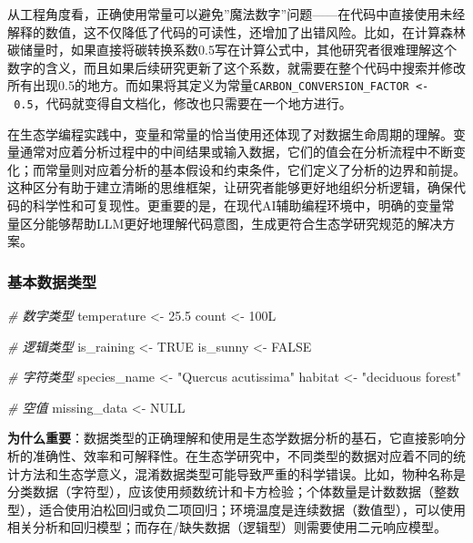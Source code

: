 \documentclass[
]{book}
\newenvironment{Shaded}{\begin{snugshade}}{\end{snugshade}}
\newcommand{\CommentTok}[1]{\textcolor[rgb]{0.56,0.35,0.01}{\textit{#1}}}
\newcommand{\ConstantTok}[1]{\textcolor[rgb]{0.56,0.35,0.01}{#1}}
\newcommand{\DataTypeTok}[1]{\textcolor[rgb]{0.13,0.29,0.53}{#1}}
\newcommand{\DecValTok}[1]{\textcolor[rgb]{0.00,0.00,0.81}{#1}}
\newcommand{\FloatTok}[1]{\textcolor[rgb]{0.00,0.00,0.81}{#1}}
\newcommand{\NormalTok}[1]{#1}
\newcommand{\OtherTok}[1]{\textcolor[rgb]{0.56,0.35,0.01}{#1}}
\newcommand{\StringTok}[1]{\textcolor[rgb]{0.31,0.60,0.02}{#1}}
\begin{document}
从工程角度看，正确使用常量可以避免''魔法数字''问题------在代码中直接使用未经解释的数值，这不仅降低了代码的可读性，还增加了出错风险。比如，在计算森林碳储量时，如果直接将碳转换系数0.5写在计算公式中，其他研究者很难理解这个数字的含义，而且如果后续研究更新了这个系数，就需要在整个代码中搜索并修改所有出现0.5的地方。而如果将其定义为常量\texttt{CARBON\_CONVERSION\_FACTOR\ \textless{}-\ 0.5}，代码就变得自文档化，修改也只需要在一个地方进行。

在生态学编程实践中，变量和常量的恰当使用还体现了对数据生命周期的理解。变量通常对应着分析过程中的中间结果或输入数据，它们的值会在分析流程中不断变化；而常量则对应着分析的基本假设和约束条件，它们定义了分析的边界和前提。这种区分有助于建立清晰的思维框架，让研究者能够更好地组织分析逻辑，确保代码的科学性和可复现性。更重要的是，在现代AI辅助编程环境中，明确的变量常量区分能够帮助LLM更好地理解代码意图，生成更符合生态学研究规范的解决方案。

\hypertarget{ux57faux672cux6570ux636eux7c7bux578b}{%
\subsubsection{基本数据类型}\label{ux57faux672cux6570ux636eux7c7bux578b}}

\begin{Shaded}
\begin{Highlighting}[]
\CommentTok{\# 数字类型}
\NormalTok{temperature }\OtherTok{\textless{}{-}} \FloatTok{25.5}
\NormalTok{count }\OtherTok{\textless{}{-}} \DecValTok{100}\DataTypeTok{L}

\CommentTok{\# 逻辑类型}
\NormalTok{is\_raining }\OtherTok{\textless{}{-}} \ConstantTok{TRUE}
\NormalTok{is\_sunny }\OtherTok{\textless{}{-}} \ConstantTok{FALSE}

\CommentTok{\# 字符类型}
\NormalTok{species\_name }\OtherTok{\textless{}{-}} \StringTok{"Quercus acutissima"}
\NormalTok{habitat }\OtherTok{\textless{}{-}} \StringTok{"deciduous forest"}

\CommentTok{\# 空值}
\NormalTok{missing\_data }\OtherTok{\textless{}{-}} \ConstantTok{NULL}
\end{Highlighting}
\end{Shaded}

\textbf{为什么重要}：数据类型的正确理解和使用是生态学数据分析的基石，它直接影响分析的准确性、效率和可解释性。在生态学研究中，不同类型的数据对应着不同的统计方法和生态学意义，混淆数据类型可能导致严重的科学错误。比如，物种名称是分类数据（字符型），应该使用频数统计和卡方检验；个体数量是计数数据（整数型），适合使用泊松回归或负二项回归；环境温度是连续数据（数值型），可以使用相关分析和回归模型；而存在/缺失数据（逻辑型）则需要使用二元响应模型。
\end{document}
